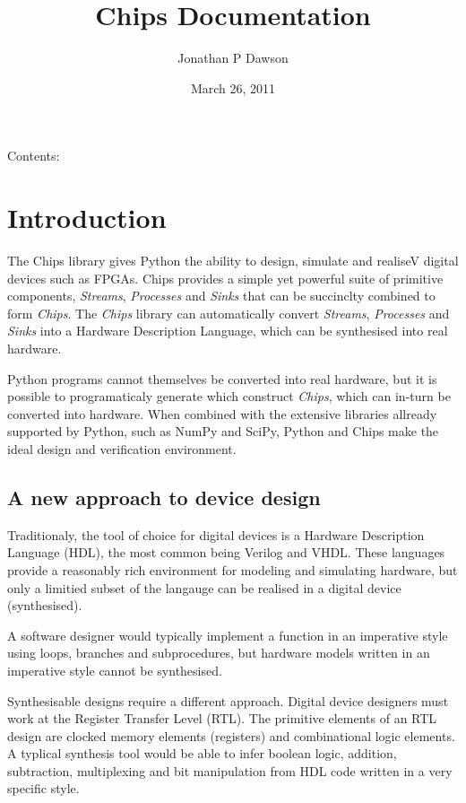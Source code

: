 \documentclass[letterpaper,10pt,english]{manual}
\title{Chips Documentation}
\date{March 26, 2011}
\author{Jonathan P Dawson}
\begin{document}
\maketitle
\tableofcontents
\hypertarget{--doc-index}{}


Contents:

\resetcurrentobjects
\hypertarget{--doc-introduction/index}{}

\chapter{Introduction}

The Chips library gives Python the ability to design, simulate and realiseV
digital devices such as FPGAs. Chips provides a simple yet powerful suite of
primitive components, \emph{Streams}, \emph{Processes} and \emph{Sinks} that can be succinclty
combined to form \emph{Chips}. The \emph{Chips} library can automatically convert
\emph{Streams}, \emph{Processes} and \emph{Sinks} into a Hardware Description Language, which
can be synthesised into real hardware.

Python programs cannot themselves be converted into real hardware, but it is
possible to programaticaly generate which construct \emph{Chips}, which can in-turn
be converted into hardware. When combined with the extensive libraries allready
supported by Python, such as NumPy and SciPy, Python and Chips make the ideal
design and verification environment.


\section{A new approach to device design}

Traditionaly, the tool of choice for digital devices is a Hardware Description
Language (HDL), the most common being Verilog and VHDL. These languages provide
a reasonably rich environment for modeling and simulating hardware, but only a
limitied subset of the langauge can be realised in a digital device
(synthesised).

A software designer would typically implement a function in an imperative style
using loops, branches and subprocedures, but hardware models written in an
imperative style cannot be synthesised.

Synthesisable designs require a different approach. Digital device designers
must work at the Register Transfer Level (RTL). The primitive elements of an
RTL design are clocked memory elements (registers) and combinational logic
elements. A typlical synthesis tool would be able to infer boolean logic,
addition, subtraction, multiplexing and bit manipulation from HDL code written
in a very specific style.
\end{document}
